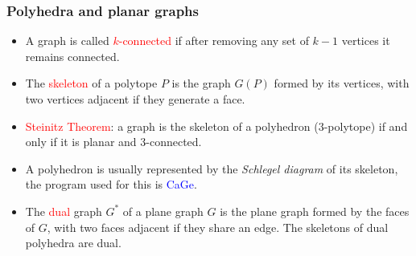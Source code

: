 \documentclass{beamer}
\begin{document}
\begin{frame}\frametitle{Polyhedra and planar graphs}
\begin{itemize}
\item A graph is called \textcolor{red}{$k$-connected} if after removing any set
of $k-1$ vertices it remains connected.

\item 
The \textcolor{red}{skeleton} of a polytope $P$ is the graph 
$G(P)$ formed
by its vertices, with two vertices adjacent if they generate a face.

\item \textcolor{red}{ Steinitz Theorem}: a  graph is the skeleton of a 
polyhedron ($3$-polytope) if and only if it is
planar and $3$-connected.

\item
A polyhedron  is usually  represented by the {\em Schlegel diagram} of its
skeleton, the program used
for this is \textcolor{blue}{CaGe}.
\item The \textcolor{red}{dual} graph $G^*$ of a plane graph $G$ is the plane
graph formed by the faces of $G$, with two faces adjacent if they share an edge.
The skeletons of dual polyhedra  are dual.

\end{itemize}
\end{frame}
\end{document}
